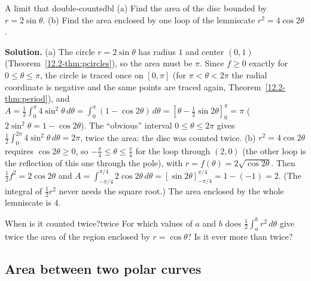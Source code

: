 \documentclass[11pt]{article}
\begin{document}
\begin{exmp}{A limit that double-counts}{dbl}
(a) Find the area of the disc bounded by $r=2\sin\theta$. (b) Find the area enclosed by one loop of the lemniscate $r^2=4\cos2\theta$.

\textbf{Solution.} (a) The circle $r=2\sin\theta$ has radius $1$ and center $(0,1)$ (Theorem~\ref{12.2-thm:pcircles}), so the area must be $\pi$. Since $f\ge0$ exactly for $0\le\theta\le\pi$, the circle is traced once on $[0,\pi]$ (for $\pi<\theta<2\pi$ the radial coordinate is negative and the same points are traced again, Theorem~\ref{12.2-thm:period}), and $A=\frac12\int_0^\pi4\sin^2\theta\,d\theta=\int_0^\pi(1-\cos2\theta)\,d\theta=\left[\theta-\frac12\sin2\theta\right]_0^\pi=\pi$ ($2\sin^2\theta=1-\cos2\theta$). The ``obvious'' interval $0\le\theta\le2\pi$ gives $\frac12\int_0^{2\pi}4\sin^2\theta\,d\theta=2\pi$, twice the area: the disc was counted twice.
(b) $r^2=4\cos2\theta$ requires $\cos2\theta\ge0$, so $-\frac\pi4\le\theta\le\frac\pi4$ for the loop through $(2,0)$ (the other loop is the reflection of this one through the pole), with $r=f(\theta)=2\sqrt{\cos2\theta}$. Then $\frac12f^2=2\cos2\theta$ and $A=\int_{-\pi/4}^{\pi/4}2\cos2\theta\,d\theta=\left[\sin2\theta\right]_{-\pi/4}^{\pi/4}=1-(-1)=2$. (The integral of $\frac12r^2$ never needs the square root.) The area enclosed by the whole lemniscate is $4$.
\end{exmp}

\begin{think}{When is it counted twice?}{twice}
For which values of $a$ and $b$ does $\frac12\int_a^br^2\,d\theta$ give twice the area of the region enclosed by $r=\cos\theta$? Is it ever more than twice?
\end{think}


\subsection*{Area between two polar curves}
\end{document}
